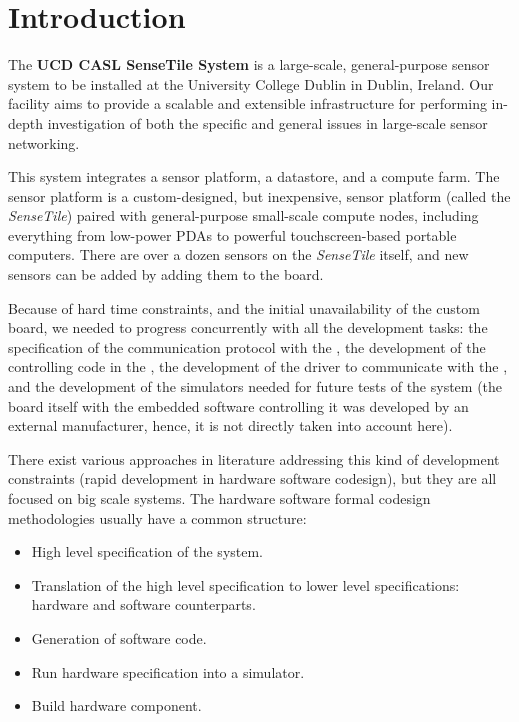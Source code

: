 \documentclass{article} \usepackage{times}
\newcommand{\ST}{\emph{SenseTile}\xspace}
\begin{document}
\section{Introduction}
\label{sec:introduction}

The \textbf{UCD CASL SenseTile System} is a large-scale,
general-purpose sensor system to be installed at the University
College Dublin in Dublin, Ireland.  Our facility aims to provide a
scalable and extensible infrastructure for performing in-depth
investigation of both the specific and general issues in large-scale
sensor networking.

This system integrates a sensor platform, a datastore, and a compute
farm.  The sensor platform is a custom-designed, but inexpensive,
sensor platform (called the \ST) paired with general-purpose
small-scale compute nodes, including everything from low-power PDAs to
powerful touchscreen-based portable computers.  There are over a dozen
sensors on the \ST itself, and new sensors can be added by adding them
to the board.

Because of hard time constraints, and the initial unavailability of
the custom board, we needed to progress concurrently with all the
development tasks: the specification of the communication protocol
with the \STSB, the development of the controlling code in the \STSB,
the development of the driver to communicate with the \STSB, and the
development of the \STSB simulators needed for future tests of the
system (the board itself with the embedded software controlling it was
developed by an external manufacturer, hence, it is not directly taken
into account here).

There exist various approaches in literature addressing this kind of
development constraints (rapid development in hardware software
codesign), but they are all focused on big scale systems.  The
hardware software formal codesign methodologies usually have a common
structure\cite{Slomka2000,Hoffman2001}:

\begin{itemize}
\item High level specification of the system.
\item Translation of the high level specification to lower level
  specifications: hardware and software counterparts.
\item Generation of software code.
\item Run hardware specification into a simulator.
\item Build hardware component.
\end{itemize}
\end{document}
